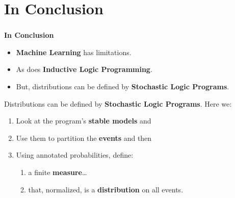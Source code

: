 \documentclass[bigger,xcolor={x11names,svgnames}]{beamer}
\begin{document}
\section{In Conclusion}
%
%
\begin{frame}
    \frametitle{}
    \vfill
    \begin{center}
        {\huge\bf In Conclusion}
    \end{center}
    \vfill
\end{frame}
%
\begin{frame}
    \begin{itemize}
        \item \textbf{Machine Learning} has limitations.
        \item As does \textbf{Inductive Logic Programming}.
        \item But, distributions can be defined by \textbf{Stochastic Logic Programs}.
    \end{itemize}
\end{frame}
%
\begin{frame}
    Distributions can be defined by \textbf{Stochastic Logic Programs}. Here we:
    \begin{enumerate}
        \item Look at the program's \textbf{stable models} and
        \item Use them to partition the \textbf{events} and then
        \item Using annotated probabilities, define:
        \begin{enumerate}
            \item a finite \textbf{measure}\ldots
            \item that, normalized, is a  \textbf{distribution} on all events.
        \end{enumerate}
    \end{enumerate}
\end{frame}
\end{document}
